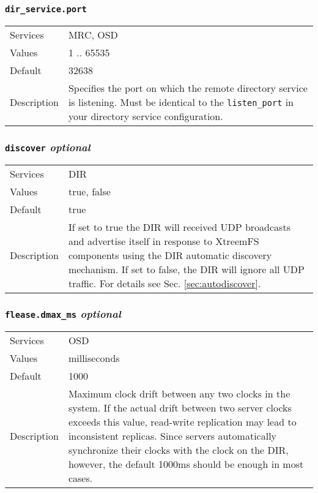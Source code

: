 \documentclass[a4paper,10pt]{book}
\begin{document}
\subsubsection{\texttt{dir\_service.port}}
\begin{tabular}{lp{10cm}}
 Services & MRC, OSD\\
 Values   & 1 .. 65535 \\
 Default  & 32638 \\
 Description & Specifies the port on which the remote directory service is listening. Must be identical to the \texttt{listen\_port} in your directory service configuration.
\end{tabular}

\subsubsection{\texttt{discover} \textit{optional}}
\begin{tabular}{lp{10cm}}
 Services & DIR\\
 Values   & true, false \\
 Default  & true \\
 Description & If set to true the DIR will received UDP broadcasts and advertise itself in response to XtreemFS components using the DIR automatic discovery mechanism. If set to false, the DIR will ignore all UDP traffic. For details see Sec. \ref{sec:autodiscover}.
\end{tabular}

\subsubsection{\texttt{flease.dmax\_ms} \textit{optional}}
\begin{tabular}{lp{10cm}}
 Services & OSD\\
 Values   & milliseconds \\
 Default  & 1000 \\
 Description & Maximum clock drift between any two clocks in the system. If the actual drift between two server clocks exceeds this value, read-write replication may lead to inconsistent replicas. Since servers automatically synchronize their clocks with the clock on the DIR, however, the default 1000ms should be enough in most cases.
\end{tabular}
\end{document}

